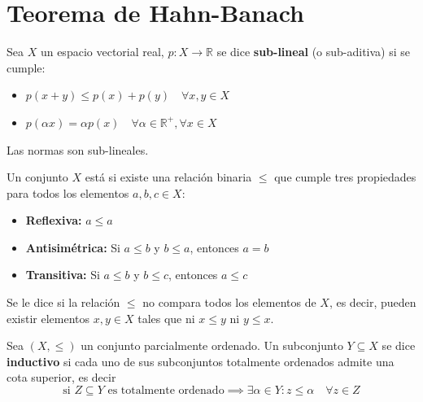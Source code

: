 \chapter{Teorema de Hahn-Banach}

\begin{definicion}
    Sea $X$ un espacio vectorial real, $p: X \to \mathbb{R}$ se dice \textbf{sub-lineal} (o sub-aditiva) si se cumple:
    \begin{itemize}
        \item[i)] $p(x+y) \leq p(x) + p(y) \quad \forall x, y \in X$
        \item[ii)] $p(\alpha x) = \alpha p(x) \quad \forall \alpha \in \mathbb{R}^+, \forall x \in X$
    \end{itemize}
\end{definicion}

\begin{ejemplo}
    Las normas son sub-lineales. \\
\end{ejemplo}

\begin{definicion}
    Un conjunto $X$ está  si existe una relación binaria $\leq$ que cumple tres propiedades para todos los elementos $a, b, c \in X$:
    \begin{itemize}
        \item[i)] \textbf{Reflexiva:} $a \leq a$
        \item[ii)] \textbf{Antisimétrica:} Si $a \leq b$ y $b \leq a$, entonces $a = b$
        \item[iii)] \textbf{Transitiva:} Si $a \leq b$ y $b \leq c$, entonces $a \leq c$
    \end{itemize}
    Se le dice  si la relación $\leq$ no compara todos los elementos de $X$, es decir, pueden existir elementos $x, y \in X$ tales que ni $x \leq y$ ni $y \leq x$.
\end{definicion}

\begin{definicion}
    Sea $(X, \leq)$ un conjunto parcialmente ordenado. Un subconjunto $Y \subseteq X$ se dice \textbf{inductivo} si cada uno de sus subconjuntos totalmente ordenados admite una cota superior, es decir
    \begin{equation*}
        \text{si } Z \subseteq Y \text{ es totalmente ordenado} \implies \exists \alpha \in Y : z \leq \alpha \quad \forall z \in Z
    \end{equation*}
\end{definicion}

